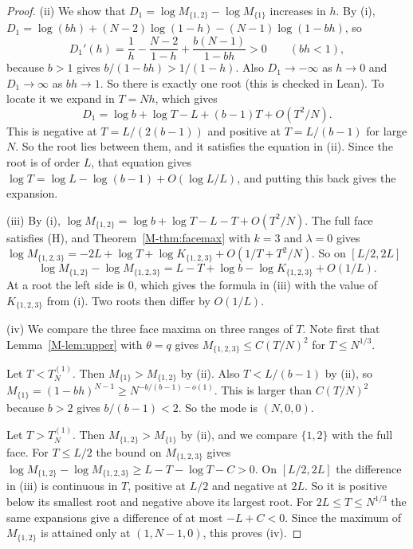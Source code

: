\documentclass[EJP,preprint]{ejpecp}
\newcommand{\mref}[1]{\ref*{M-#1}}
\begin{document}
\begin{proof}
(ii) We show that $D_1=\log M_{\{1,2\}}-\log M_{\{1\}}$ increases in $h$. By (i),
$D_1=\log(bh)+(N-2)\log(1-h)-(N-1)\log(1-bh)$, so
\[
D_1'(h)=\frac1h-\frac{N-2}{1-h}+\frac{b(N-1)}{1-bh}>0\qquad(bh<1),
\]
because $b>1$ gives $b/(1-bh)>1/(1-h)$. Also $D_1\to-\infty$ as $h\to0$ and $D_1\to\infty$ as
$bh\to1$. So there is exactly one root (this is checked in Lean). To locate it we expand in
$T=Nh$, which gives
\[
D_1=\log b+\log T-L+(b-1)T+O(T^2/N).
\]
This is negative at $T=L/(2(b-1))$ and positive at $T=L/(b-1)$ for large $N$. So the root lies
between them, and it satisfies the equation in (ii). Since the root is of order $L$, that
equation gives $\log T=\log L-\log(b-1)+O(\log L/L)$, and putting this back gives the expansion.

(iii) By (i), $\log M_{\{1,2\}}=\log b+\log T-L-T+O(T^2/N)$. The full face satisfies (H), and
Theorem~\mref{thm:facemax} with $k=3$ and $\lambda=0$ gives
$\log M_{\{1,2,3\}}=-2L+\log T+\log K_{\{1,2,3\}}+O(1/T+T^2/N)$. So on $[L/2,2L]$
\[
\log M_{\{1,2\}}-\log M_{\{1,2,3\}}=L-T+\log b-\log K_{\{1,2,3\}}+O(1/L).
\]
At a root the left side is $0$, which gives the formula in (iii) with the value of
$K_{\{1,2,3\}}$ from (i). Two roots then differ by $O(1/L)$.

(iv) We compare the three face maxima on three ranges of $T$. Note first that
Lemma~\mref{lem:upper} with $\theta=q$ gives $M_{\{1,2,3\}}\le C(T/N)^2$ for $T\le N^{1/3}$.

Let $T<T^{(1)}_N$. Then $M_{\{1\}}>M_{\{1,2\}}$ by (ii). Also $T<L/(b-1)$ by (ii), so
$M_{\{1\}}=(1-bh)^{N-1}\ge N^{-b/(b-1)-o(1)}$. This is larger than $C(T/N)^2$ because
$b>2$ gives $b/(b-1)<2$. So the mode is $(N,0,0)$.

Let $T>T^{(1)}_N$. Then $M_{\{1,2\}}>M_{\{1\}}$ by (ii), and we compare $\{1,2\}$ with the full
face. For $T\le L/2$ the bound on $M_{\{1,2,3\}}$ gives
$\log M_{\{1,2\}}-\log M_{\{1,2,3\}}\ge L-T-\log T-C>0$. On $[L/2,2L]$ the
difference in (iii) is continuous in $T$, positive at $L/2$ and negative at
$2L$. So it is positive below its smallest root and negative above its largest root. For
$2L\le T\le N^{1/3}$ the same expansions give a difference of at most $-L+C<0$. Since the
maximum of $M_{\{1,2\}}$ is attained only at $(1,N-1,0)$, this proves (iv).
\end{proof}
\end{document}
